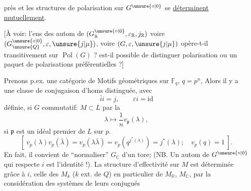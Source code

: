 près et les structures de polarisation sur $G^{\unsure{\circ|0}}$ se \uline{déterminent mutuellement}.

 [À voir: l'ens des autom de $(G^{\unsure{\circ|0}}_{\mathbb R},\varepsilon_{\mathbb R},j_{\mathbb R})$ voire $(G^{\unsure{\circ|0}}_{\unsure{Q}},\varepsilon,\unsure{j|\mu})$, voire $(G,\varepsilon,\unsure{j|\mu})$ opère-t-il transitivement sur $\operatorname{Pol}(G)$ ?  est-il possible  de distinguer    polarisation ou un paquet de polarisations préférentielles ?]

Prenons p.ex. une catégorie de Motifs géométriques sur $\mathbb F_q$, $q=p^n$,  Alors  il y a une classe de conjugaison d'homs
distinguée, avec
\[
\bar i i=j,\qquad\varepsilon i=\mathrm{id}
\]
définie,  si $G$ commutatif: $M\subset L$  par la
\[
\lambda\longmapsto\frac1n v_{\mathfrak p}(\lambda),
\]
si $\mathfrak p$ est un idéal premier de $L$ sur $p$.
\[
[\ v_p(\lambda)v_p(\bar\lambda)=v_p(\lambda\bar\lambda)=v_p(q^{j^*(\lambda)})=j^*(\lambda);\quad v_p(q)=1\ ].
\]
En fait, il convient de ``normaliser'' $G_{\mathbb C}$   d'un tore; (NB. Un autom de $G^{\unsure{\circ|0}}$ qui  respecte $i$ est l'identité !). La structure d'effectivité sur $M$ est déterminée grâce à $i$, celle des $M_k$ ($k$ ext. de $Q$) en particulier de $M_{\mathbb R}$, $M_{\mathbb C}$, par la considération des systèmes de leurs conjugués
